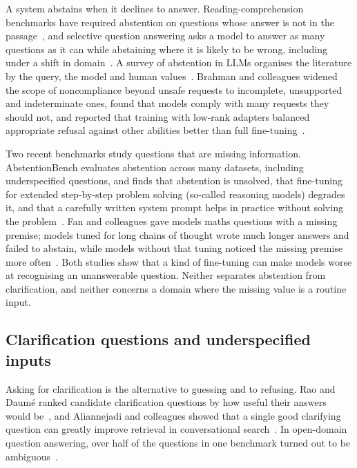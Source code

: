 A system abstains when it declines to answer. Reading-comprehension benchmarks have required abstention on questions whose answer is not in the passage~\cite{rajpurkar2018know}, and selective question answering asks a model to answer as many questions as it can while abstaining where it is likely to be wrong, including under a shift in domain~\cite{kamath2020selective}. A survey of abstention in LLMs organises the literature by the query, the model and human values~\cite{wen2024know}. Brahman and colleagues widened the scope of noncompliance beyond unsafe requests to incomplete, unsupported and indeterminate ones, found that models comply with many requests they should not, and reported that training with low-rank adapters balanced appropriate refusal against other abilities better than full fine-tuning~\cite{brahman2024art}.

Two recent benchmarks study questions that are missing information. AbstentionBench evaluates abstention across many datasets, including underspecified questions, and finds that abstention is unsolved, that fine-tuning for extended step-by-step problem solving (so-called reasoning models) degrades it, and that a carefully written system prompt helps in practice without solving the problem~\cite{kirichenko2025abstentionbench}. Fan and colleagues gave models maths questions with a missing premise; models tuned for long chains of thought wrote much longer answers and failed to abstain, while models without that tuning noticed the missing premise more often~\cite{fan2025missing}. Both studies show that a kind of fine-tuning can make models worse at recognising an unanswerable question. Neither separates abstention from clarification, and neither concerns a domain where the missing value is a routine input.

\subsection{Clarification questions and underspecified inputs}
\label{sec:rev-clarification}

Asking for clarification is the alternative to guessing and to refusing. Rao and Daum\'e ranked candidate clarification questions by how useful their answers would be~\cite{rao2018learning}, and Aliannejadi and colleagues showed that a single good clarifying question can greatly improve retrieval in conversational search~\cite{aliannejadi2019asking}. In open-domain question answering, over half of the questions in one benchmark turned out to be ambiguous~\cite{min2020ambigqa}.

